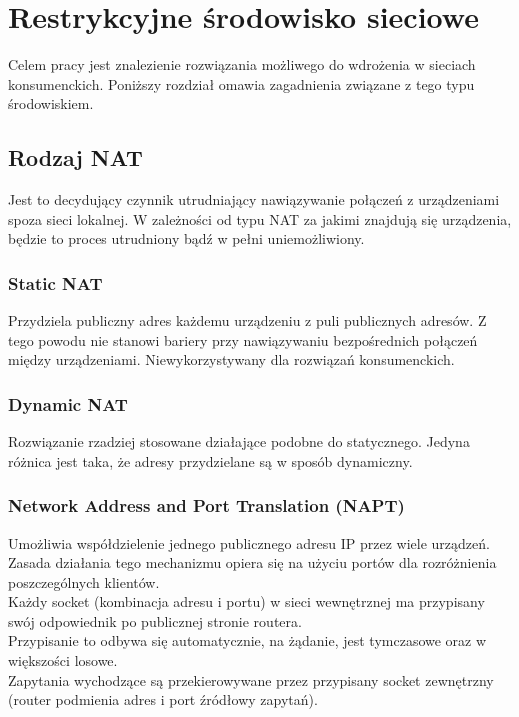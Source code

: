 \section{Restrykcyjne środowisko sieciowe}
Celem pracy jest znalezienie rozwiązania możliwego do wdrożenia w sieciach konsumenckich. Poniższy rozdział omawia zagadnienia związane z tego typu środowiskiem.

\subsection{Rodzaj NAT}
Jest to decydujący czynnik utrudniający nawiązywanie połączeń z urządzeniami spoza sieci lokalnej. W zależności od typu NAT za jakimi znajdują się urządzenia, będzie to proces utrudniony bądź w pełni uniemożliwiony.

\subsubsection{Static NAT}
Przydziela publiczny adres każdemu urządzeniu z puli publicznych adresów. Z tego powodu nie stanowi bariery przy nawiązywaniu bezpośrednich połączeń między urządzeniami. Niewykorzystywany dla rozwiązań konsumenckich.

\subsubsection{Dynamic NAT}
Rozwiązanie rzadziej stosowane działające podobne do statycznego. Jedyna różnica jest taka, że adresy przydzielane są w sposób dynamiczny.

\newpage

\subsubsection{Network Address and Port Translation (NAPT)}
Umożliwia współdzielenie jednego publicznego adresu IP przez wiele urządzeń. Zasada działania tego mechanizmu opiera się na użyciu portów dla rozróżnienia poszczególnych klientów.\\

Każdy socket (kombinacja adresu i portu) w sieci wewnętrznej ma przypisany swój odpowiednik po publicznej stronie routera.\\

Przypisanie to odbywa się automatycznie, na żądanie, jest tymczasowe oraz w większości losowe.\\

Zapytania wychodzące są przekierowywane przez przypisany socket zewnętrzny (router podmienia adres i port źródłowy zapytań).\\

